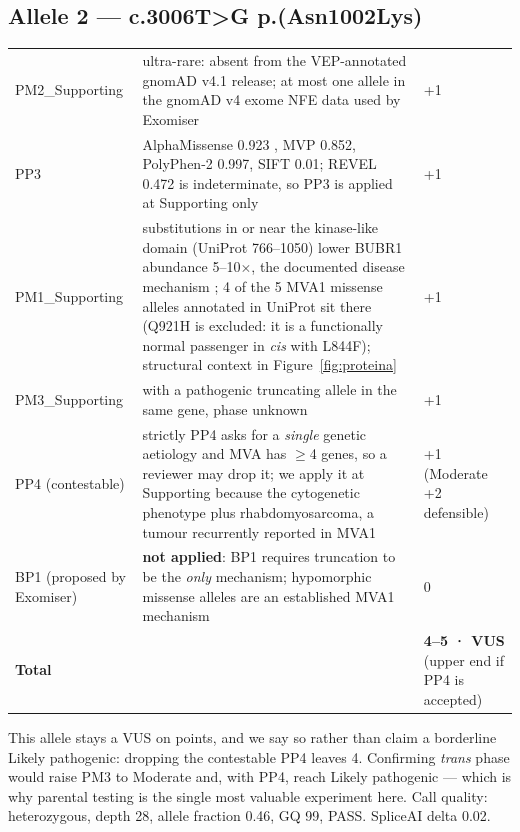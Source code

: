 \documentclass[10pt]{article}
\begin{document}
\subsection{Allele 2 — c.3006T>G p.(Asn1002Lys)}
\begin{table}[H]\tablefont
\begin{tabularx}{\linewidth}{@{}P{2.75cm}LP{1.8cm}@{}}
\toprule{} &  & \\\midrule
PM2\_Supporting & ultra-rare: absent from the VEP-annotated gnomAD v4.1 release; at most one allele in the gnomAD v4 exome NFE data used by Exomiser & +1\\
PP3 & AlphaMissense 0.923 \citep{alphamissense}, MVP 0.852, PolyPhen-2 0.997, SIFT 0.01; REVEL 0.472 is indeterminate, so PP3 is applied at Supporting only & +1\\
PM1\_Supporting & substitutions in or near the kinase-like domain (UniProt 766–1050) lower BUBR1 abundance 5–10$\times$, the documented disease mechanism \citep{suij}; 4 of the 5 MVA1 missense alleles annotated in UniProt sit there (Q921H is excluded: it is a functionally normal passenger in \emph{cis} with L844F); structural context in Figure~\ref{fig:proteina} & +1\\
PM3\_Supporting & with a pathogenic truncating allele in the same gene, phase unknown & +1\\
PP4 (contestable) & strictly PP4 asks for a \emph{single} genetic aetiology and MVA has $\geq$4 genes, so a reviewer may drop it; we apply it at Supporting because the cytogenetic phenotype plus rhabdomyosarcoma, a tumour recurrently reported in MVA1 & +1 (Moderate +2 defensible)\\
BP1 (proposed by Exomiser) & \textbf{not applied}: BP1 requires truncation to be the \textit{only} mechanism; hypomorphic missense alleles are an established MVA1 mechanism & 0\\\midrule
\textbf{Total} & & \textbf{4–5 · VUS} (upper end if PP4 is accepted)\\\bottomrule
\end{tabularx}\end{table}
This allele stays a VUS on points, and we say so rather than claim a borderline Likely pathogenic: dropping the
contestable PP4 leaves 4. Confirming \emph{trans} phase would raise PM3 to Moderate and, with PP4, reach Likely
pathogenic --- which is why parental testing is the single most valuable experiment here. Call quality: heterozygous, depth 28, allele fraction 0.46, GQ 99, PASS. SpliceAI delta 0.02.
\end{document}
